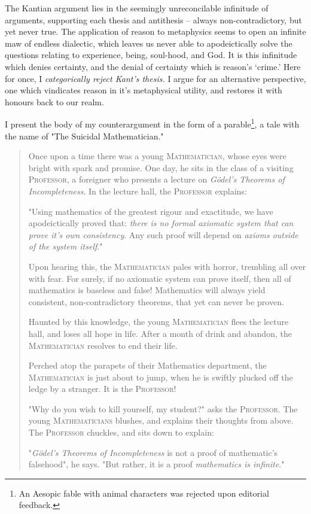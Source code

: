 \noindent
The Kantian argument lies in the seemingly unreconcilable infinitude of arguments, supporting each thesis and antithesis -- always non-contradictory, but yet never true. The application of reason to metaphysics seems to open an infinite maw of endless dialectic, which leaves us never able to apodeictically solve the questions relating to experience, being, soul-hood, and God. It is this infinitude which denies certainty, and the denial of certainty which is reason's `crime.' Here for once, I \emph{categorically reject Kant's thesis.} I argue for an alternative perspective, one which vindicates reason in it's metaphysical utility, and restores it with honours back to our realm.

I present the body of my counterargument in the form of a parable\footnote{An Aesopic fable with animal characters was rejected upon editorial feedback.}, a tale with the name of "The Suicidal Mathematician."

\begin{quote}
  Once upon a time there was a young \textsc{Mathematician}, whose eyes were bright with spark and promise. One day, he sits in the class of a visiting \textsc{Professor}, a foreigner who presents a lecture on \emph{Gödel's Theorems of Incompleteness}. In the lecture hall, the \textsc{Professor} explains:

  "Using mathematics of the greatest rigour and exactitude, we have apodeictically proved that: \emph{there is no formal axiomatic system that can prove it's own consistency}. Any such proof will depend on \emph{axioms outside of the system itself}."

  Upon hearing this, the \textsc{Mathematician} pales with horror, trembling all over with fear. For surely, if no axiomatic system can prove itself, then all of mathematics is baseless and false! Mathematics will always yield consistent, non-contradictory theorems, that yet can never be proven.

  Haunted by this knowledge, the young \textsc{Mathematician} flees the lecture hall, and loses all hope in life. After a month of drink and abandon, the \textsc{Mathematician} resolves to end their life.

  Perched atop the parapets of their Mathematics department, the \textsc{Mathematician} is just about to jump, when he is swiftly plucked off the ledge by a stranger. It is the \textsc{Professor!}

  "Why do you wish to kill yourself, my student?" asks the \textsc{Professor}. The young \textsc{Mathematicians} blushes, and explains their thoughts from above. The \textsc{Professor} chuckles, and sits down to explain:

  "\emph{Gödel's Theorems of Incompleteness} is not a proof of mathematic's falsehood", he says. "But rather, it is a proof \emph{mathematics is infinite}."
\end{quote}

